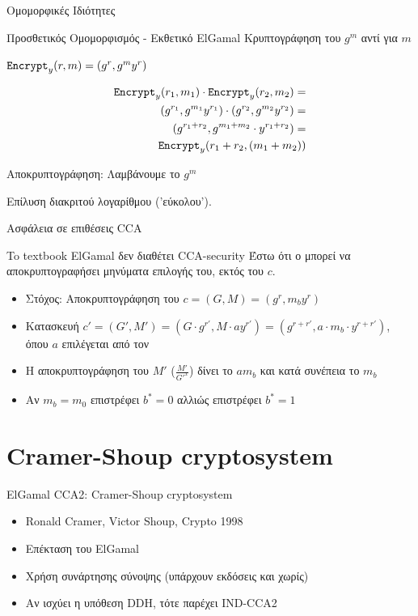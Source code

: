 \documentclass[handout]{beamer}
\begin{document}
\begin{frame}{Ομομορφικές Ιδιότητες}

\begin{block}{Προσθετικός Ομομορφισμός - Εκθετικό ElGamal}
Κρυπτογράφηση του $g^m$ αντί για $m$

$\mathtt{Encrypt}_y(r,m) = (g^r, g^m y^r)$

\begin{align*}
  \mathtt{Encrypt}_y(r_1,m_1) \cdot \mathtt{Encrypt}_y(r_2,m_2) = \\
(g^{r_1}, g^{m_1} y^{r_1}) \cdot  (g^{r_2}, g^{m_2} y^{r_2}) =\\
(g^{r_1+r_2} , g^{m_1 + m_2} \cdot y^{r_1+r_2}) = \\
\mathtt{Encrypt}_y(r_1+r_2,(m_1 + m_2))
\end{align*}

Αποκρυπτογράφηση: Λαμβάνουμε το $g^m$

\alert{Επίλυση διακριτού λογαρίθμου ('εύκολου')}.

\end{block}

\end{frame}

\begin{frame}{Ασφάλεια σε επιθέσεις CCA}
 
\begin{block}{To textbook ElGamal δεν διαθέτει CCA-security}
Έστω ότι ο \adv  μπορεί να αποκρυπτογραφήσει μηνύματα επιλογής του, εκτός του $c$.
\begin{itemize}
\item Στόχος: Αποκρυπτογράφηση του $c = (G,M) = (g^r, m_b y^r)$
\pause
\item Κατασκευή $c' = (G',M') = (G \cdot g^{r'}, M \cdot a y^{r'}) = (g^{r+r'}, a \cdot m_b \cdot y^{r+r'}) $, όπου $a$ επιλέγεται από τον  \adv 
\pause
\item H αποκρυπτογράφηση του $M'$ ($\frac{M'}{G'^x}$) δίνει το $am_b$ και κατά συνέπεια το $m_b$
\pause
\item Αν $m_b = m_0$ επιστρέφει $b^*=0$ αλλιώς επιστρέφει $b^*=1$
\end{itemize}
\end{block}
\end{frame}

\section{Cramer-Shoup cryptosystem}

\begin{frame}{ElGamal CCA2: Cramer-Shoup cryptosystem}
\begin{itemize}
\item Ronald Cramer, Victor Shoup, Crypto 1998 \pause
\item Επέκταση του ElGamal \pause
\item Χρήση συνάρτησης σύνοψης \hash (υπάρχουν εκδόσεις και χωρίς)
\item Αν ισχύει η υπόθεση DDH, τότε παρέχει IND-CCA2
\end{itemize}
\end{frame}
\end{document}
